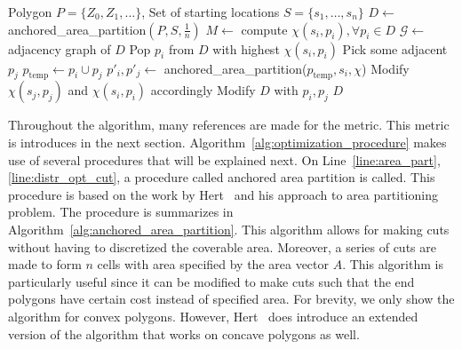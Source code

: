 \documentclass[../main.tex]{subfiles}
\begin{document}
\begin{algorithm}
	\caption{$\operatorname{optimization\_procedure}(P, S)$}
	\label{alg:optimization_procedure}
	\begin{algorithmic}[1]
		\REQUIRE Polygon $P=\{Z_0,Z_1,\ldots\}$, Set of starting locations $S=\{s_1,\ldots,s_n\}$
			\STATE $D\gets$ anchored\_area\_partition$(P,S,\frac{1}{n})$ \label{line:area_part}
			\STATE $M\gets$ compute $\chi(s_i,p_i), \forall p_i\in D$ 
			\STATE $\mathcal{G}\gets$ adjacency graph of $D$
			\REPEAT
				\STATE Pop $p_i$ from $D$ with highest $\chi(s_i,p_i)$
				\STATE Pick some adjacent $p_j$
				\STATE $p_{\operatorname{temp}}\gets p_i\cup p_j$
				\STATE $p'_i,p'_j\gets$ anchored\_area\_partition($p_{\text{temp}},s_i,\chi$) \label{line:distr_opt_cut}
				\STATE Modify $\chi(s_j,p_j)$ and $\chi(s_i,p_i)$ accordingly
				\STATE Modify $D$ with $p_i,p_j$
			\RETURN $D$
	\end{algorithmic}
\end{algorithm}

Throughout the algorithm, many references are made for the metric. This metric is introduces in the next section. Algorithm~\ref{alg:optimization_procedure} makes use of several procedures that will be explained next. On Line~\ref{line:area_part},\ref{line:distr_opt_cut}, a procedure called anchored area partition is called. This procedure is based on the work by Hert~\cite{hert1998polygon} and his approach to area partitioning problem. The procedure is summarizes in Algorithm~\ref{alg:anchored_area_partition}. This algorithm allows for making cuts without having to discretized the coverable area. Moreover, a series of cuts are made to form $n$ cells with area specified by the area vector $A$. This algorithm is particularly useful since it can be modified to make cuts such that the end polygons have certain cost instead of specified area. For brevity, we only show the algorithm for convex polygons. However, Hert~\cite{hert1998polygon} does introduce an extended version of the algorithm that works on concave polygons as well.
\end{document}
